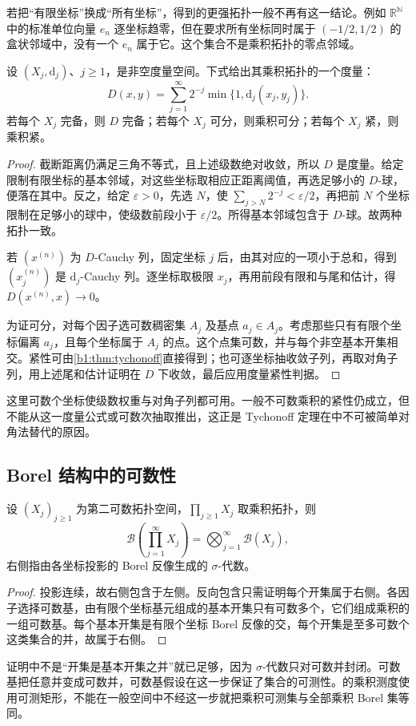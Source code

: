 若把“有限坐标”换成“所有坐标”，得到的更强拓扑一般不再有这一结论。例如 \(\mathbb R^{\mathbb N}\) 中的标准单位向量 \(e_n\) 逐坐标趋零，但在要求所有坐标同时属于 \((-1/2,1/2)\) 的盒状邻域中，没有一个 \(e_n\) 属于它。这个集合不是乘积拓扑的零点邻域。

\begin{theorem}[可数乘积的度量]\label{b1:thm:app-countable-product}
设 \((X_j,\mathrm{d}_j)\)、\(j\ge1\)，是非空度量空间。下式给出其乘积拓扑的一个度量：
\[
 D(x,y)=\sum_{j=1}^{\infty}2^{-j}\min\{1,\mathrm{d}_j(x_j,y_j)\}.
\]
若每个 \(X_j\) 完备，则 \(D\) 完备；若每个 \(X_j\) 可分，则乘积可分；若每个 \(X_j\) 紧，则乘积紧。
\end{theorem}
\begin{proof}
截断距离仍满足三角不等式，且上述级数绝对收敛，所以 \(D\) 是度量。给定限制有限坐标的基本邻域，对这些坐标取相应正距离阈值，再选足够小的 \(D\)-球，便落在其中。反之，给定 \(\varepsilon>0\)，先选 \(N\)，使 \(\sum_{j>N}2^{-j}<\varepsilon/2\)，再把前 \(N\) 个坐标限制在足够小的球中，使级数前段小于 \(\varepsilon/2\)。所得基本邻域包含于 \(D\)-球。故两种拓扑一致。

若 \((x^{(n)})\) 为 \(D\)-Cauchy 列，固定坐标 \(j\) 后，由其对应的一项小于总和，得到 \((x_j^{(n)})\) 是 \(\mathrm{d}_j\)-Cauchy 列。逐坐标取极限 \(x_j\)，再用前段有限和与尾和估计，得 \(D(x^{(n)},x)\rightarrow0\)。

为证可分，对每个因子选可数稠密集 \(A_j\) 及基点 \(a_j\in A_j\)。考虑那些只有有限个坐标偏离 \(a_j\)，且每个坐标属于 \(A_j\) 的点。这个点集可数，并与每个非空基本开集相交。紧性可由\cref{b1:thm:tychonoff}直接得到；也可逐坐标抽收敛子列，再取对角子列，用上述尾和估计证明在 \(D\) 下收敛，最后应用度量紧性判据。
\end{proof}

这里可数个坐标使级数权重与对角子列都可用。一般不可数乘积的紧性仍成立，但不能从这一度量公式或可数次抽取推出，这正是 Tychonoff 定理在中不可被简单对角法替代的原因。

\subsection{Borel 结构中的可数性}
\label{b1:subsec:A10303}

\begin{proposition}\label{b1:prop:app-product-borel}
设 \((X_j)_{j\ge1}\) 为第二可数拓扑空间，\(\prod_{j\ge1}X_j\) 取乘积拓扑，则
\[
 \mathcal B\left(\prod_{j=1}^{\infty}X_j\right)
 =\bigotimes_{j=1}^{\infty}\mathcal B(X_j),
\]
右侧指由各坐标投影的 Borel 反像生成的 \(\sigma\)-代数。
\end{proposition}
\begin{proof}
投影连续，故右侧包含于左侧。反向包含只需证明每个开集属于右侧。各因子选择可数基，由有限个坐标基元组成的基本开集只有可数多个，它们组成乘积的一组可数基。每个基本开集是有限个坐标 Borel 反像的交，每个开集是至多可数个这类集合的并，故属于右侧。
\end{proof}

证明中不是“开集是基本开集之并”就已足够，因为 \(\sigma\)-代数只对可数并封闭。可数基把任意并变成可数并，可数基假设在这一步保证了集合的可测性。的乘积测度使用可测矩形，不能在一般空间中不经这一步就把乘积可测集与全部乘积 Borel 集等同。
